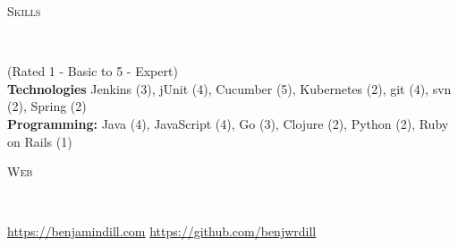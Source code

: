 \documentclass[9pt]{article}
\newenvironment{changemargin}[2]{%
  \begin{list}{}{%
      \setlength{\topsep}{0pt}%
      \setlength{\leftmargin}{#1}%
      \setlength{\rightmargin}{#2}%
      \setlength{\listparindent}{\parindent}%
      \setlength{\itemindent}{\parindent}%
      \setlength{\parsep}{\parskip}%
    }%
  \item[]}{\end{list}
}
\newcommand{\lineover}{
  \begin{changemargin}{-0.05in}{-0.05in}
    \vspace*{-8pt}
    \hrulefill \\
    \vspace*{-2pt}
  \end{changemargin}
}
\newcommand{\header}[1]{
  \begin{changemargin}{-0.5in}{-0.5in}
    \scshape{#1}\\
    \lineover
  \end{changemargin}
}
\newenvironment{body} {
  \vspace*{-16pt}
  \begin{changemargin}{-0.25in}{-0.5in}
  }	
  {\end{changemargin}
}
\begin{document}
\smallskip


\header{Skills}

\begin{body}
  \vspace{17pt}
  {(Rated 1 - Basic to 5 - Expert)} \\
  \textbf{Technologies} Jenkins (3), jUnit (4), Cucumber (5), Kubernetes (2), git (4), svn (2), Spring (2) \\
  \textbf{Programming:} Java (4), JavaScript (4), Go (3), Clojure (2), Python (2), Ruby on Rails (1) \\
\end{body}

\smallskip

\header{Web}

\begin{body}
  \vspace{17pt}
  \url{https://benjamindill.com} \hfill{} \url{https://github.com/benjwrdill} \\
\end{body}
\end{document}
